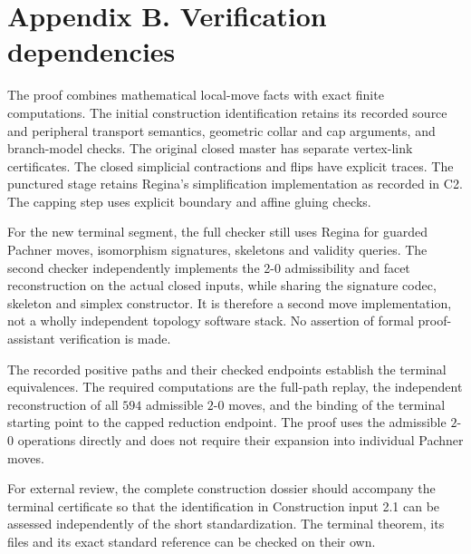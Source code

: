 \documentclass[11pt,letterpaper]{article}
\begin{document}
\section*{Appendix B. Verification dependencies}
The proof combines mathematical local-move facts with exact finite computations. The initial construction identification retains its recorded source and peripheral transport semantics, geometric collar and cap arguments, and branch-model checks. The original closed master has separate vertex-link certificates. The closed simplicial contractions and flips have explicit traces. The punctured stage retains Regina's simplification implementation as recorded in C2. The capping step uses explicit boundary and affine gluing checks.

For the new terminal segment, the full checker still uses Regina for guarded Pachner moves, isomorphism signatures, skeletons and validity queries. The second checker independently implements the 2-0 admissibility and facet reconstruction on the actual closed inputs, while sharing the signature codec, skeleton and simplex constructor. It is therefore a second move implementation, not a wholly independent topology software stack. No assertion of formal proof-assistant verification is made.

The recorded positive paths and their checked endpoints establish the terminal equivalences. The required computations are the full-path replay, the independent reconstruction of all $594$ admissible $2$-$0$ moves, and the binding of the terminal starting point to the capped reduction endpoint. The proof uses the admissible $2$-$0$ operations directly and does not require their expansion into individual Pachner moves.

For external review, the complete construction dossier should accompany the terminal certificate so that the identification in Construction input 2.1 can be assessed independently of the short standardization. The terminal theorem, its files and its exact standard reference can be checked on their own.
\end{document}
